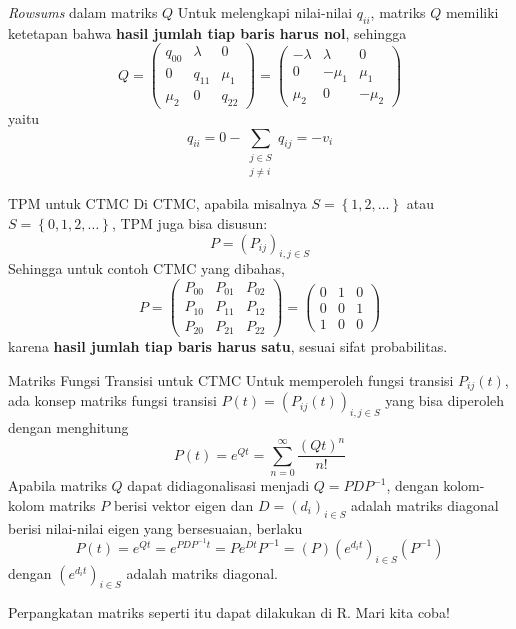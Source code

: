 \documentclass{beamer}
\newcommand{\pars}[1]{\left(#1\right)}
\newcommand{\braces}[1]{\left\{#1\right\}}
\begin{document}
\begin{frame}{\textit{Rowsums} dalam matriks \(Q\)}
    Untuk melengkapi nilai-nilai \(q_{ii}\), matriks \(Q\) memiliki ketetapan bahwa \textbf{hasil jumlah tiap baris harus nol}, sehingga
    \[Q = \begin{pmatrix}
        q_{00} & \lambda & 0     \\
        0      & q_{11}  & \mu_1 \\
        \mu_2  & 0       & q_{22}
    \end{pmatrix} = \begin{pmatrix}
        -\lambda & \lambda & 0     \\
        0       & -\mu_1   & \mu_1 \\
        \mu_2   & 0        & -\mu_2
    \end{pmatrix}\]
    yaitu
    \[q_{ii} = 0 - \sum_{\substack{j\in S \\ j \ne i}} q_{ij} = -v_i\]
\end{frame}

\begin{frame}{TPM untuk CTMC}
    Di CTMC, apabila misalnya \(S=\braces{1,2,\dots}\) atau \(S=\braces{0,1,2,\dots}\), TPM juga bisa disusun: \[P = \pars{P_{ij}}_{i,j \in S} \]
    Sehingga untuk contoh CTMC yang dibahas,
    \[P = \begin{pmatrix}
        P_{00} & P_{01} & P_{02} \\
        P_{10} & P_{11} & P_{12} \\
        P_{20} & P_{21} & P_{22}
    \end{pmatrix} = \begin{pmatrix}
        0 & 1 & 0 \\
        0 & 0 & 1 \\
        1 & 0 & 0
    \end{pmatrix}\]
    karena \textbf{hasil jumlah tiap baris harus satu}, sesuai sifat probabilitas.
\end{frame}

\begin{frame}{Matriks Fungsi Transisi untuk CTMC}
    Untuk memperoleh fungsi transisi \(P_{ij}(t)\), ada konsep matriks fungsi transisi \(P(t) = \pars{P_{ij}(t)}_{i,j \in S}\) yang bisa diperoleh dengan menghitung
    \[P(t) = e^{Qt} = \sum_{n=0}^{\infty} \frac{\pars{Qt}^n}{n!}\]
    Apabila matriks \(Q\) dapat didiagonalisasi menjadi \(Q = PDP^{-1}\), dengan kolom-kolom matriks \(P\) berisi vektor eigen dan \(D = \pars{d_i}_{i\in S}\) adalah matriks diagonal berisi nilai-nilai eigen yang bersesuaian, berlaku
    \[P(t) = e^{Qt} = e^{PDP^{-1}t} = P e^{Dt} P^{-1} = \pars{P} \pars{e^{d_i t}}_{i \in S} \pars{P^{-1}}\]
    dengan \( \pars{e^{d_i t}}_{i \in S} \) adalah matriks diagonal.

    Perpangkatan matriks seperti itu dapat dilakukan di R. Mari kita coba!
\end{frame}
\end{document}
